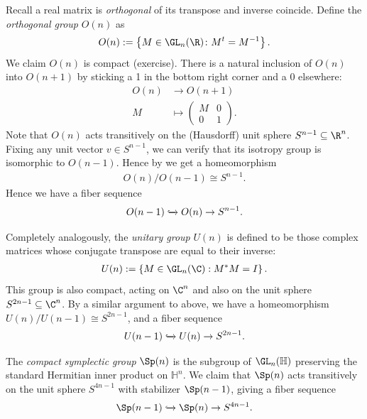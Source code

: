 \documentclass[11pt]{book}
\begin{document}
\begin{example}
Recall a real matrix is \emph{orthogonal} of its transpose and inverse coincide. Define the \emph{orthogonal group} $O(n)$ as
\begin{align*}
    O(n) := \left\{ M \in \GL_n(\R) \colon M^t = M^{-1} \right\}.
\end{align*}
We claim $O(n)$ is compact (exercise). There is a natural inclusion of $O(n)$ into $O(n+1)$ by sticking a 1 in the bottom right corner and a 0 elsewhere:
\begin{align*}
    O(n) &\to O(n+1) \\
    M &\mapsto \begin{pmatrix} M & 0 \\ 0 & 1 \end{pmatrix}.
\end{align*}
Note that $O(n)$ acts transitively on the (Hausdorff) unit sphere $S^{n-1} \subseteq \R^n$. Fixing any unit vector $v\in S^{n-1}$, we can verify that its isotropy group is isomorphic to $O(n-1)$. Hence by  we get a homeomorphism
\begin{align*}
    O(n)/O(n-1) \cong S^{n-1}.
\end{align*}
Hence we have a fiber sequence
\begin{align*}
    O(n-1) \xhookrightarrow{} O(n) \to S^{n-1}.
\end{align*}
\end{example}

\begin{example} Completely analogously, the \emph{unitary group} $U(n)$ is defined to be those complex matrices whose conjugate transpose are equal to their inverse:
\begin{align*}
    U(n) := \left\{ M\in \GL_n(\C) : M^\ast M = I \right\}.
\end{align*}
This group is also compact, acting on $\C^n$ and also on the unit sphere $S^{2n-1} \subseteq \C^n$. By a similar argument to above, we have a homeomorphism $U(n)/U(n-1) \cong S^{2n-1}$, and a fiber sequence
\begin{align*}
    U(n-1) \xhookrightarrow{} U(n) \to S^{2n-1}.
\end{align*}
\end{example}

\begin{example} The \emph{compact symplectic group} $\Sp(n)$ is the subgroup of $\GL_n(\mathbb{H})$ preserving the standard Hermitian inner product on $\mathbb{H}^n$. We claim that $\Sp(n)$ acts transitively on the unit sphere $S^{4n-1}$ with stabilizer $\Sp(n-1)$, giving a fiber sequence
\begin{align*}
    \Sp(n-1) \hookto \Sp(n) \to S^{4n-1}.
\end{align*}
\end{example}
\end{document}
